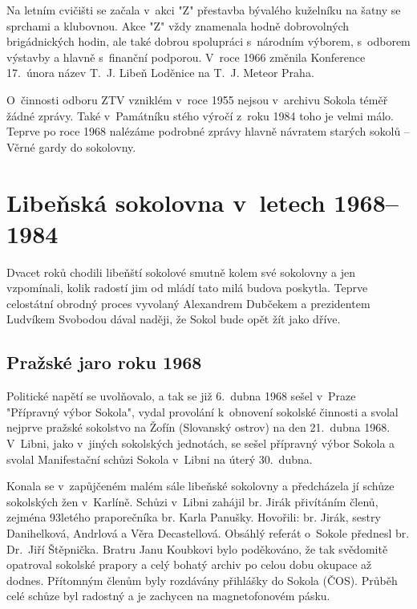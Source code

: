 \documentclass[a5paper, 11pt, twoside]{article}
\begin{document}
Na letním cvičišti se začala v~akci "Z" přestavba bývalého kuželníku na
šatny se sprchami a klubovnou. Akce "Z" vždy znamenala hodně
dobrovolných brigádnických hodin, ale také dobrou spolupráci s~národním
výborem, s~odborem výstavby a hlavně s~finanční podporou. V~roce 1966
změnila Konference 17.~února název T.~J. Libeň Loděnice na T.~J. Meteor
Praha.

O~činnosti odboru ZTV vzniklém v~roce 1955 nejsou v~archivu Sokola téměř
žádné zprávy. Také v~Památníku stého výročí z~roku 1984 toho je velmi
málo. Teprve po roce 1968 nalézáme podrobné zprávy hlavně návratem
starých sokolů -- Věrné gardy do sokolovny.

\section{Libeňská sokolovna v~letech
1968--1984}

Dvacet roků chodili libeňští sokolové smutně kolem své sokolovny a jen
vzpomínali, kolik radostí jim od mládí tato milá budova poskytla. Teprve
celostátní obrodný proces vyvolaný Alexandrem Dubčekem a prezidentem
Ludvíkem Svobodou dával naději, že Sokol bude opět žít jako dříve.

\subsection{Pražské jaro roku 1968}

Politické napětí se uvolňovalo, a tak se již 6.~dubna 1968 sešel v~Praze
"Přípravný výbor Sokola", vydal provolání k~obnovení sokolské činnosti
a svolal nejprve pražské sokolstvo na Žofín (Slovanský ostrov) na den
21.~dubna 1968. V~Libni, jako v~jiných sokolských jednotách, se sešel
přípravný výbor Sokola a svolal Manifestační schůzi Sokola v~Libni na
úterý 30.~dubna.

{\sloppy Konala se v~zapůjčeném malém sále libeňské sokolovny a předcházela jí
schůze sokolských žen v~Karlíně. Schůzi v~Libni zahájil br. Jirák
přivítáním členů, zejména 93letého praporečníka br. Karla Panušky.
Hovořili: br. Jirák, sestry Danihelková, Andrlová a Věra Decastellová.
Obsáhlý referát o~Sokole přednesl br. Dr.~Jiří Štěpnička. Bratru Janu
Koubkovi bylo poděkováno, že tak svědomitě opatroval sokolské prapory a
celý bohatý archiv po celou dobu okupace až dodnes. Přítomným členům
byly rozdávány přihlášky do Sokola (ČOS). Průběh celé schůze byl
radostný a je zachycen na magnetofonovém pásku.\par}
\end{document}
